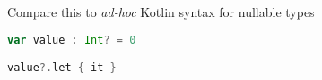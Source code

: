 \documentclass[10pt]{beamer}
\begin{document}
\begin{frame}[fragile]
Compare this to \emph{ad-hoc} Kotlin syntax for nullable types 
\begin{lstlisting}[language=Scala, basicstyle=\ttfamily]
var value : Int? = 0

value?.let { it }
\end{lstlisting}
\end{frame}






















\end{document}
